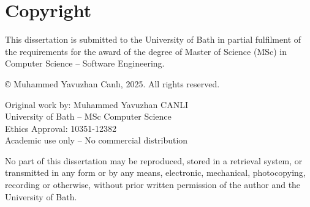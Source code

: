 \chapter*{Copyright}

\noindent
This dissertation is submitted to the University of Bath in partial fulfilment of the requirements for the award of the degree of Master of Science (MSc) in Computer Science – Software Engineering.

\vspace{1cm}

\noindent
© Muhammed Yavuzhan Canlı, 2025. All rights reserved.

\vspace{0.5cm}

\noindent
Original work by: Muhammed Yavuzhan CANLI\\
University of Bath – MSc Computer Science\\
Ethics Approval: 10351-12382\\
Academic use only – No commercial distribution

\vspace{1cm}

\noindent
No part of this dissertation may be reproduced, stored in a retrieval system, or transmitted in any form or by any means, electronic, mechanical, photocopying, recording or otherwise, without prior written permission of the author and the University of Bath.
